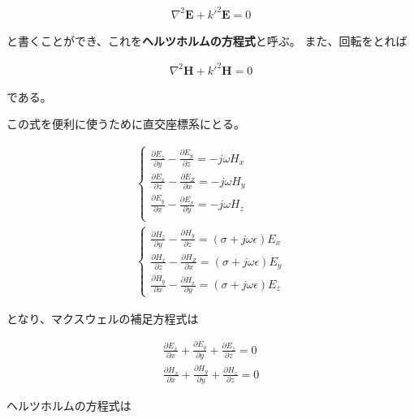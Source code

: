 \documentclass[7pt,uplatex,dvipdfmx,twocolumn]{jsarticle}
\begin{document}
\begin{align}
\nabla ^2\bm{E}+k'^2\bm{E}=0
\end{align}

と書くことができ、これを\textbf{ヘルツホルムの方程式}と呼ぶ。
また、回転をとれば

\begin{align}
  \nabla ^2\bm{H}+k'^2\bm{H}=0
  \end{align}

  である。

この式を便利に使うために直交座標系にとる。

\begin{align}
\begin{cases}
\frac{\partial E_z}{\partial y}-\frac{\partial E_y}{\partial z}=-j\omega H_x\\
\frac{\partial E_x}{\partial z}-\frac{\partial E_Z}{\partial x}=-j\omega H_y\\
\frac{\partial E_y}{\partial x}-\frac{\partial E_x}{\partial y}=-j\omega H_z \\
\end{cases}\\
\begin{cases}
\frac{\partial H_z}{\partial y}-\frac{\partial H_y}{\partial z}=(\sigma +j\omega\epsilon)E_x\\
\frac{\partial H_x}{\partial z}-\frac{\partial H_Z}{\partial x}=(\sigma +j\omega\epsilon)E_y\\
\frac{\partial H_y}{\partial x}-\frac{\partial H_x}{\partial y}=(\sigma +j\omega\epsilon)E_z
  \end{cases}
\end{align}

となり、マクスウェルの補足方程式は

\begin{align}
\frac{\partial E_x}{\partial x}+\frac{\partial E_y}{\partial y}+\frac{\partial E_z}{\partial z}=0\\
\frac{\partial H_x}{\partial x}+\frac{\partial H_y}{\partial y}+\frac{\partial H_z}{\partial z}=0
\end{align}

ヘルツホルムの方程式は
\end{document}
